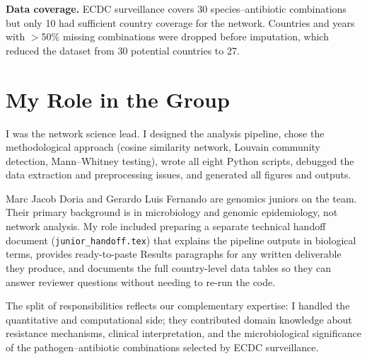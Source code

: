 \documentclass[12pt,a4paper]{article}
\begin{document}
\textbf{Data coverage.}
ECDC surveillance covers 30 species--antibiotic combinations but only
10 had sufficient country coverage for the network.
Countries and years with $>$50\% missing combinations were dropped before
imputation, which reduced the dataset from 30 potential countries to 27.

\section{My Role in the Group}

I was the network science lead.
I designed the analysis pipeline, chose the methodological approach
(cosine similarity network, Louvain community detection, Mann--Whitney
testing), wrote all eight Python scripts, debugged the data extraction
and preprocessing issues, and generated all figures and outputs.

Marc Jacob Doria and Gerardo Luis Fernando are genomics juniors on the
team.
Their primary background is in microbiology and genomic epidemiology,
not network analysis.
My role included preparing a separate technical handoff document
(\texttt{junior\_handoff.tex}) that explains the pipeline outputs
in biological terms, provides ready-to-paste Results paragraphs for
any written deliverable they produce, and documents the full
country-level data tables so they can answer reviewer questions
without needing to re-run the code.

The split of responsibilities reflects our complementary expertise:
I handled the quantitative and computational side; they contributed
domain knowledge about resistance mechanisms, clinical interpretation,
and the microbiological significance of the pathogen--antibiotic
combinations selected by ECDC surveillance.
\end{document}
